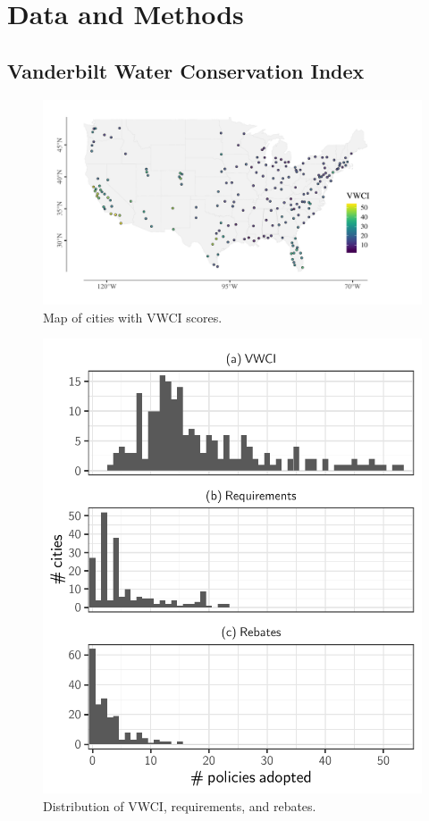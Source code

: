 \documentclass[draft,linenumbers]{agujournal}\usepackage{knitr}
\begin{document}
\section{Data and Methods}
\label{sec:data.methods}
\subsection{Vanderbilt Water Conservation Index}
%
%
%
\begin{figure}[htp]
\includegraphics[width=6.5in,angle=0]{figures_clean/vwci_map-1} \caption[Map of cities with VWCI scores]{Map of cities with VWCI scores.}\label{fig:vwci_map}
\end{figure}

%
%
\begin{figure}[tb]

{\centering \includegraphics[width=0.8\linewidth]{figures_clean/vwci_histogram-1} 

}

\caption[Distribution of VWCI, requirements, and rebates]{Distribution of VWCI, requirements, and rebates.}\label{fig:vwci_histogram}
\end{figure}
\end{document}

